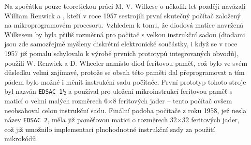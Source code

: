 {        Na zpočátku pouze teoretickou práci M. V. Wilkese o několik let později navázali William 
        Renwick a \wikiWheeler, kteří v roce 1957 sestrojili první skutečný počítač založený na 
        mikroprogramovém procesoru. Vzhledem k tomu, že diodová matice navržená Wilkesem by byla 
        příliš rozměrná pro počítač s velkou instrukční sadou (diodami jsou zde samozřejmě myšleny 
        diskrétní elektronické součástky, i když se v roce 1957 již pomalu schylovalo k výrobě 
        prvních prototypů integrovaných obvodů), použili W. Renwick a D. Wheeler namísto diod 
        feritovou paměť, což bylo ve svém důsledku velmi zajímavé, protože se obsah této paměti dal 
        přeprogramovat a tím pádem bylo možné i měnit instrukční sadu počítače. První prototyp 
        tohoto stroje byl nazván \texttt{EDSAC 1½} a používal pro uložení mikroinstrukcí feritovou 
        paměť s maticí o velmi malých rozměrech 6×8 feritových jader – tento počítač ovšem 
        neobsahoval celou instrukční sadu. Finální podoba počítače z roku 1958, jež nesla název 
        \texttt{EDSAC 2}, měla již paměťovou matici o rozměrech 32×32 feritových jader, což již 
        umožnilo implementaci plnohodnotné instrukční sady za použití mikrokódů.
    
} %
\printbibliography[title={Seznam literatury}, heading=subbibliography]

